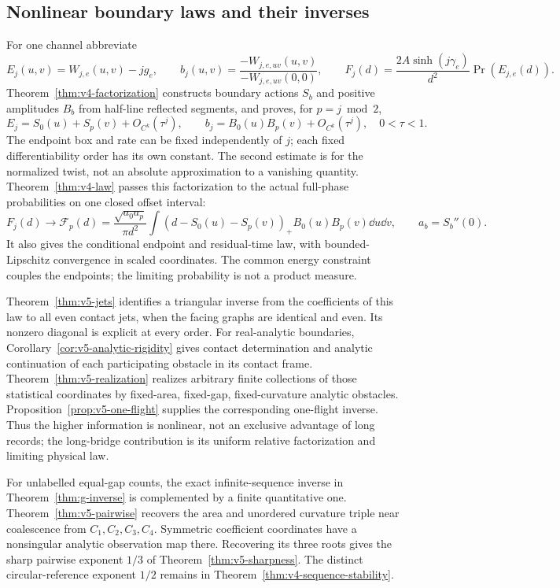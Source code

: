 \subsection{Nonlinear boundary laws and their inverses}
For one channel abbreviate
\[
 E_j(u,v)=W_{j,e}(u,v)-jg_e,\qquad
 b_j(u,v)=\frac{-W_{j,e,uv}(u,v)}{-W_{j,e,uv}(0,0)},\qquad
 F_j(d)=\frac{2A\sinh(j\gamma_e)}{d^2}\Pr(E_{j,e}(d)).
\]
Theorem~\ref{thm:v4-factorization} constructs boundary actions $S_b$
and positive amplitudes $B_b$ from half-line reflected segments, and
proves, for $p=j\bmod2$,
\[
 E_j=S_0(u)+S_p(v)+O_{C^k}(\tau^j),\qquad
 b_j=B_0(u)B_p(v)+O_{C^k}(\tau^j),\quad 0<\tau<1.
\]
The endpoint box and rate can be fixed independently of $j$; each
fixed differentiability order has its own constant. The second estimate
is for the normalized twist, not an absolute approximation to a
vanishing quantity. Theorem~\ref{thm:v4-law} passes this factorization
to the actual full-phase probabilities on one closed offset interval:
\[
 F_j(d)\longrightarrow\mathcal F_p(d)
 =\frac{\sqrt{a_0a_p}}{\pi d^2}
   \int(d-S_0(u)-S_p(v))_+B_0(u)B_p(v)\dd u\dd v,
 \qquad a_b=S_b''(0).
\]
It also gives the conditional endpoint and residual-time law, with
bounded-Lipschitz convergence in scaled coordinates. The common energy
constraint couples the endpoints; the limiting probability is not a
product measure.

Theorem~\ref{thm:v5-jets} identifies a triangular inverse from the
coefficients of this law to all even contact jets, when the facing
graphs are identical and even. Its nonzero diagonal is explicit at every
order. For real-analytic boundaries, Corollary~\ref{cor:v5-analytic-rigidity}
gives contact determination and analytic continuation of each
participating obstacle in its contact frame. Theorem~\ref{thm:v5-realization}
realizes arbitrary finite collections of those statistical coordinates
by fixed-area, fixed-gap, fixed-curvature analytic obstacles.
Proposition~\ref{prop:v5-one-flight} supplies the corresponding one-flight
inverse. Thus the higher information is nonlinear, not an exclusive
advantage of long records; the long-bridge contribution is its uniform
relative factorization and limiting physical law.

For unlabelled equal-gap counts, the exact infinite-sequence inverse in
Theorem~\ref{thm:g-inverse} is complemented by a finite quantitative one.
Theorem~\ref{thm:v5-pairwise} recovers the area and unordered curvature
triple near coalescence from $C_1,C_2,C_3,C_4$. Symmetric coefficient
coordinates have a nonsingular analytic observation map there. Recovering
its three roots gives the sharp pairwise exponent $1/3$ of
Theorem~\ref{thm:v5-sharpness}. The distinct circular-reference exponent
$1/2$ remains in Theorem~\ref{thm:v4-sequence-stability}.

